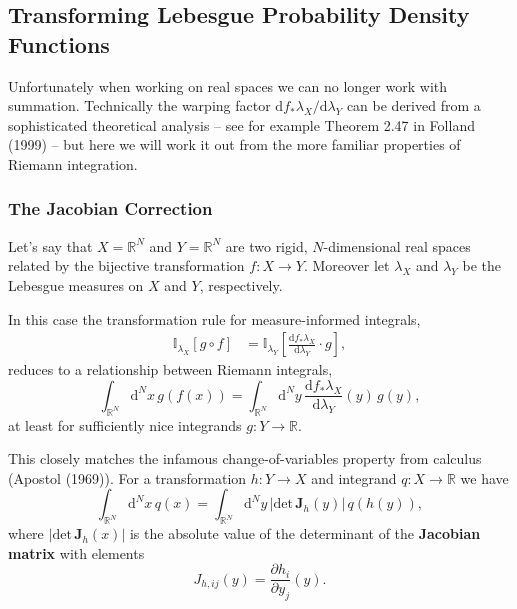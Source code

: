 \documentclass[
  letterpaper,
  DIV=11,
  numbers=noendperiod]{scrartcl}
\begin{document}
\hypertarget{transforming-lebesgue-probability-density-functions}{%
\subsection{Transforming Lebesgue Probability Density
Functions}\label{transforming-lebesgue-probability-density-functions}}

Unfortunately when working on real spaces we can no longer work with
summation. Technically the warping factor
\(\mathrm{d} f_{*} \lambda_{X} / \mathrm{d} \lambda_{Y}\) can be derived
from a sophisticated theoretical analysis -- see for example Theorem
2.47 in Folland (1999) -- but here we will work it out from the more
familiar properties of Riemann integration.

\hypertarget{the-jacobian-correction}{%
\subsubsection{The Jacobian Correction}\label{the-jacobian-correction}}

Let's say that \(X = \mathbb{R}^{N}\) and \(Y = \mathbb{R}^{N}\) are two
rigid, \(N\)-dimensional real spaces related by the bijective
transformation \(f : X \rightarrow Y\). Moreover let \(\lambda_{X}\) and
\(\lambda_{Y}\) be the Lebesgue measures on \(X\) and \(Y\),
respectively.

In this case the transformation rule for measure-informed integrals,
\begin{align*}
\mathbb{I}_{\lambda_{X}} [ g \circ f ]
&=
\mathbb{I}_{\lambda_{Y}} \left[
\frac{ \mathrm{d} f_{*} \lambda_{X} }{ \mathrm{d} \lambda_{Y}} \cdot g
\right],
\end{align*} reduces to a relationship between Riemann integrals, \[
\int_{\mathbb{R}^{N}} \mathrm{d}^{N} x \, g(f(x))
=
\int_{\mathbb{R}^{N}} \mathrm{d}^{N} y \,
\frac{ \mathrm{d} f_{*} \lambda_{X} }{ \mathrm{d} \lambda_{Y}}(y) \,
g(y),
\] at least for sufficiently nice integrands
\(g : Y \rightarrow \mathbb{R}\).

This closely matches the infamous change-of-variables property from
calculus (Apostol (1969)). For a transformation \(h : Y \rightarrow X\)
and integrand \(q : X \rightarrow \mathbb{R}\) we have \[
\int_{\mathbb{R}^{N}} \mathrm{d}^{N} x \, q(x)
=
\int_{\mathbb{R}^{N}} \mathrm{d}^{N} y \,
| \mathrm{det} \,  \mathbf{J}_{h}(y) | \, q(h(y)),
\] where \(| \mathrm{det} \, \mathbf{J}_{h}(x) |\) is the absolute value
of the determinant of the \textbf{Jacobian matrix} with elements \[
J_{h, ij}(y) = \frac{ \partial h_{i} }{ \partial y_{j} } (y).
\]
\end{document}
